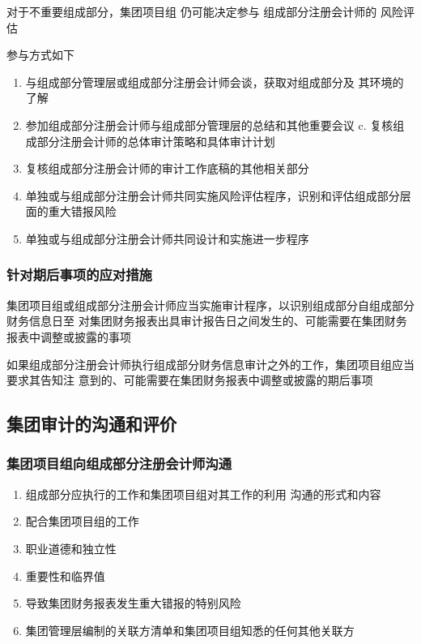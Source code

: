 \documentclass[UTF8,12pt]{ctexart}
\numberwithin{equation}{section} %
\numberwithin{figure}{section}
\numberwithin{table}{section}
\begin{document}
	对于不重要组成部分，集团项目组  仍可能决定参与  组成部分注册会计师的  风险评估
	
	参与方式如下
	\begin{enumerate}
		\item 与组成部分管理层或组成部分注册会计师会谈，获取对组成部分及 其环境的了解
		 
		\item 参加组成部分注册会计师与组成部分管理层的总结和其他重要会议 c. 复核组成部分注册会计师的总体审计策略和具体审计计划
		 
		\item 复核组成部分注册会计师的审计工作底稿的其他相关部分
		
		\item 单独或与组成部分注册会计师共同实施风险评估程序，识别和评估组成部分层面的重大错报风险
		
		\item 单独或与组成部分注册会计师共同设计和实施进一步程序
	\end{enumerate}
	
	\subsubsection{针对期后事项的应对措施}
	集团项目组或组成部分注册会计师应当实施审计程序，以识别组成部分自组成部分财务信息日至 对集团财务报表出具审计报告日之间发生的、可能需要在集团财务报表中调整或披露的事项
	
	如果组成部分注册会计师执行组成部分财务信息审计之外的工作，集团项目组应当要求其告知注 意到的、可能需要在集团财务报表中调整或披露的期后事项
	
	
	\subsection{集团审计的沟通和评价}
	
	\subsubsection{集团项目组向组成部分注册会计师沟通}
	
	\begin{enumerate}
		\item 组成部分应执行的工作和集团项目组对其工作的利用    沟通的形式和内容
		
		\item 配合集团项目组的工作
		
		\item 职业道德和独立性
		
		\item 重要性和临界值
		
		\item 导致集团财务报表发生重大错报的特别风险
		
		\item 集团管理层编制的关联方清单和集团项目组知悉的任何其他关联方
		
	\end{enumerate}
	
\end{document}
